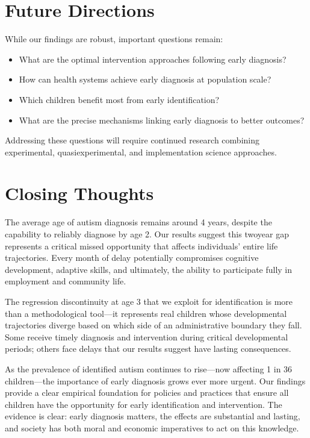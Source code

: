 \documentclass[letterpaper,10pt,english]{jupyterBook}
\begin{document}
\section{Future Directions}
\label{\detokenize{conclusion:future-directions}}
\sphinxAtStartPar
While our findings are robust, important questions remain:
\begin{itemize}
\item {} 
\sphinxAtStartPar
What are the optimal intervention approaches following early diagnosis?

\item {} 
\sphinxAtStartPar
How can health systems achieve early diagnosis at population scale?

\item {} 
\sphinxAtStartPar
Which children benefit most from early identification?

\item {} 
\sphinxAtStartPar
What are the precise mechanisms linking early diagnosis to better outcomes?

\end{itemize}

\sphinxAtStartPar
Addressing these questions will require continued research combining experimental, quasi\sphinxhyphen{}experimental, and implementation science approaches.


\section{Closing Thoughts}
\label{\detokenize{conclusion:closing-thoughts}}
\sphinxAtStartPar
The average age of autism diagnosis remains around 4 years, despite the capability to reliably diagnose by age 2. Our results suggest this two\sphinxhyphen{}year gap represents a critical missed opportunity that affects individuals’ entire life trajectories. Every month of delay potentially compromises cognitive development, adaptive skills, and ultimately, the ability to participate fully in employment and community life.

\sphinxAtStartPar
The regression discontinuity at age 3 that we exploit for identification is more than a methodological tool—it represents real children whose developmental trajectories diverge based on which side of an administrative boundary they fall. Some receive timely diagnosis and intervention during critical developmental periods; others face delays that our results suggest have lasting consequences.

\sphinxAtStartPar
As the prevalence of identified autism continues to rise—now affecting 1 in 36 children—the importance of early diagnosis grows ever more urgent. Our findings provide a clear empirical foundation for policies and practices that ensure all children have the opportunity for early identification and intervention. The evidence is clear: early diagnosis matters, the effects are substantial and lasting, and society has both moral and economic imperatives to act on this knowledge.
\end{document}

